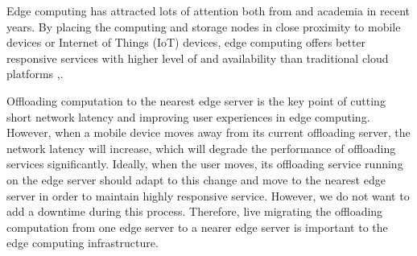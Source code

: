


Edge computing has attracted lots of attention both from  and academia in recent years\cite{satya2009case,  MEC2014initiative, MEC2015-5G, yi2015fog,yi2015survey, satya2017edge}.
By placing the computing and storage nodes in close proximity to mobile devices or Internet of Things (IoT) devices, edge computing offers better responsive services with higher level of  and availability than traditional cloud platforms \cite{MEC2014initiative},\cite{satya2017edge}.

Offloading computation to the nearest edge server is the key point of cutting short network latency and improving user experiences in edge computing. 
However, when a mobile device moves away from its current offloading server, the network latency will increase, which will degrade the performance of offloading services significantly. Ideally, when the user moves, its offloading service running on the edge server should adapt to this change and move to the nearest edge server in order to maintain highly responsive service. However, we do not want to add a downtime during this process.
Therefore, live migrating the offloading computation from one edge server to a nearer edge server is important to the edge computing infrastructure. 

